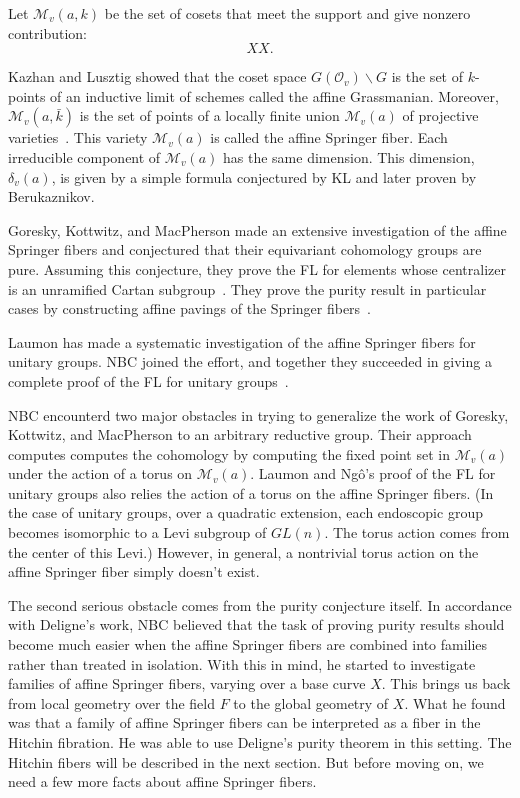 \documentclass[brochure,english,12pt]{bourbaki}
\def\b{\backslash }
\def\M{{\mathcal M}}
\def\O{{\mathcal O}}
\begin{document}
Let $\M_v(a,k)$ be the set of cosets that meet the support and give nonzero contribution:
\[
XX.
\]

Kazhan and Lusztig showed that the coset space $G(\O_v)\b G$ is the set of
$k$-points of an inductive limit of schemes called the affine Grassmanian.   
Moreover, $\M_v(a,\bar k)$ is the set of points of a locally finite union
$\M_v(a)$ of projective varieties~\cite{KL:1988}.  This variety $\M_v(a)$ is called the affine Springer
fiber.  Each irreducible component of $\M_v(a)$ has the same dimension.  This dimension,
$\delta_v(a)$, is given by a simple formula conjectured by KL and later proven by Berukaznikov.

Goresky, Kottwitz, and MacPherson made an extensive investigation of
the affine Springer fibers and conjectured that their equivariant
cohomology groups are pure.  Assuming this conjecture, they prove the
FL for elements whose centralizer is an unramified
Cartan subgroup~\cite{GKM:2004}.  They prove the purity result in particular cases by
constructing affine pavings of the Springer fibers~\cite{GKM:2006}.

Laumon has made a systematic investigation of
the affine Springer fibers for unitary groups.  NBC joined the effort, and together they
succeeded in giving a complete proof of the FL for unitary groups~\cite{LN:08}.

NBC encounterd two major obstacles in trying to generalize the work of
Goresky, Kottwitz, and MacPherson to an arbitrary reductive group.
Their approach computes computes the cohomology by computing the fixed
point set in $\M_v(a)$ under the action of a torus on $\M_v(a)$.  Laumon and
Ng\^o's proof of the FL for unitary groups also relies
the action of a torus on the affine Springer fibers.  (In the case of
unitary groups, over a quadratic extension, each
endoscopic group becomes isomorphic to a Levi subgroup of $GL(n)$.
The torus action comes from the center of this Levi.)  However, in
general, a nontrivial torus action on the affine Springer fiber simply
doesn't exist.

The second serious obstacle comes from the purity conjecture itself.
In accordance with Deligne's work, NBC believed that the task of proving
purity results should become much easier when the affine Springer fibers are
combined into families rather than treated in isolation.  With this in
mind, he started to investigate families of affine Springer fibers,
varying over a base curve $X$.  This brings us back from local
geometry over the field $F$ to the global geometry of $X$.  What he
found was that a family of affine Springer fibers can be interpreted as 
a fiber in the Hitchin fibration.  He was able to use Deligne's purity
theorem in this setting.  The Hitchin fibers will be described in the
next section.  But before moving on, we need a few more facts about
affine Springer fibers.
\end{document}
